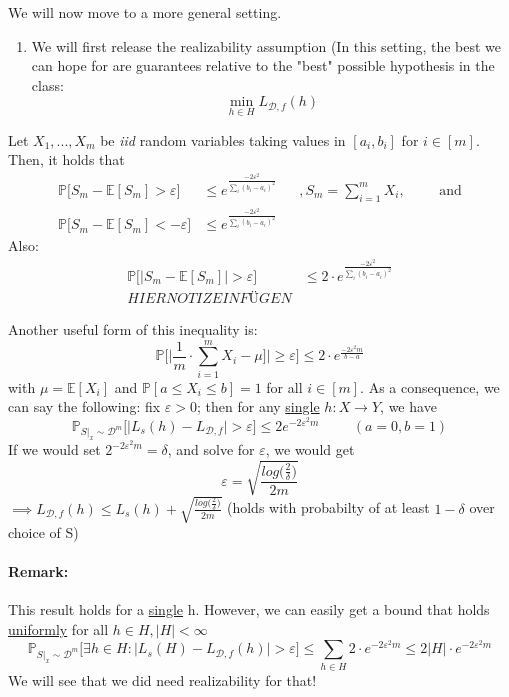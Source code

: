 \documentclass[10pt,a4paper]{article}
\theoremstyle{definition}
\theoremstyle{plain}
\begin{document}
We will now move to a more general setting.
\begin{enumerate}[label*=\protect\fbox{\arabic{enumi}}]
	\item We will first release the realizability assumption (In this setting, the best we can hope for are guarantees relative to the "best" possible hypothesis in the class: $$\min_{h \in H}{L_{\mathcal{D}, f}(h)}$$
\end{enumerate}
	\begin{boxeddef}
	Let $X_1, ..., X_m$ be \textit{iid} random variables taking values in $[a_i, b_i]$ for $i \in [m]$. Then, it holds that
	 \begin{align*}
	 	\mathbb{P}\bigg[S_m - \mathbb{E}[S_m] > \varepsilon\bigg] &\leq e^{\frac{-2 \varepsilon^2}{\sum_{i} (b_i - a_i)^2}} && , S_m = \sum_{i = 1}^{m} X_i, &&& \text{and}\\
	 	\mathbb{P}\bigg[S_m - \mathbb{E}[S_m] < -\varepsilon\bigg] &\leq e^{\frac{-2 \varepsilon^2}{\sum_{i} (b_i - a_i)^2}} 
	\end{align*}
	Also:
	\begin{align*}
	 	\mathbb{P}\bigg[\big|S_m - \mathbb{E}[S_m]\big| > \varepsilon\bigg] &\leq 2 \cdot e^{\frac{-2 \varepsilon^2}{\sum_{i} (b_i - a_i)^2}}\\
	 	HIER NOTIZ EINFÜGEN
	 \end{align*}

\end{boxeddef}
Another useful form of this inequality is:
$$ \mathbb{P} \bigg[\bigg| \frac{1}{m} \cdot \sum_{i = 1}^{m} X_i - \mu ]\bigg| \geq \varepsilon\bigg] \leq 2 \cdot e^{\frac{-2 \varepsilon^2 m}{b-a}} $$
with $\mu = \mathbb{E}[X_i]$ and $\mathbb{P}[a \leq X_i \leq b] = 1$ for all $i \in [m]$. As a consequence, we can say the following: fix $\varepsilon>0$; then for any \colorbox{Apricot}{\underline{single} $h: X \to Y$}, we have 
$$ \mathbb{P}_{S|_x \sim \mathcal{D}^m}\bigg[\big|L_{s}(h) - L_{\mathcal{D}, f}\big| > \varepsilon\bigg] \leq 2 e^{-2\varepsilon^2 m} \hspace{1cm} (a = 0, b = 1)$$
If we would set $2^{-2 \varepsilon^2 m} = \delta$, and solve for $\varepsilon$, we would get
$$ \varepsilon = \sqrt{\frac{log\big(\frac{2}{\delta}\big)}{2m}} $$
$\implies L_{\mathcal{D},f}(h) \leq L_{s}(h) + \sqrt{\frac{log\big(\frac{2}{\delta}\big)}{2m}} $ (holds with probabilty of at least $1-\delta$ over choice of S)
\paragraph{Remark:} This result holds for a \underline{single} h. However, we can easily get a bound that holds \underline{uniformly} for all $h \in H, |H| < \infty$
$$ \mathbb{P}_{S|_x \sim \mathcal{D}^m} \bigg[\exists h \in H: \big|L_{s}(H) - L_{\mathcal{D}, f}(h) \big| > \varepsilon \bigg] \leq \sum_{h \in H} 2\cdot e^{-2 \varepsilon^2 m} \leq 2 \big|H\big| \cdot e^{-2 \varepsilon^2 m} $$ 
We will see that we did need realizability for that!
\end{document}

